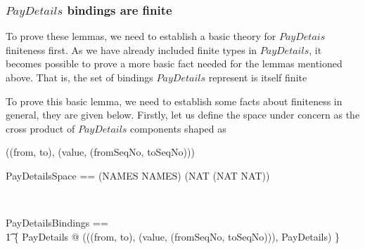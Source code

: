 
\subsubsection{$PayDetails$ bindings are finite}

To prove these lemmas, we need to establish a basic theory for $PayDetais$ finiteness first.
As we have already included finite types in $PayDetails$, it becomes possible to prove a more basic
fact needed for the lemmas mentioned above. That is, the set of bindings $PayDetails$ represent is itself finite
%
%
To prove this basic lemma, we need to establish some facts about finiteness in general, they are given below.
Firstly, let us define the space under concern as the cross product of $PayDetails$ components
shaped as
\begin{gzed}
((from, to), (value, (fromSeqNo, toSeqNo)))
\end{gzed}
%
\begin{LNewADef}
\begin{zed}
   PayDetailsSpace == (NAMES \cross NAMES) \cross (NAT \cross (NAT \cross NAT))
\end{zed}~\end{LNewADef}

\begin{LNewADef}
\begin{zed}
   PayDetailsBindings == \\
    \t1 \{ PayDetails @ (((from, to), (value, (fromSeqNo, toSeqNo))), \theta PayDetails) \}
\end{zed}~\end{LNewADef}


